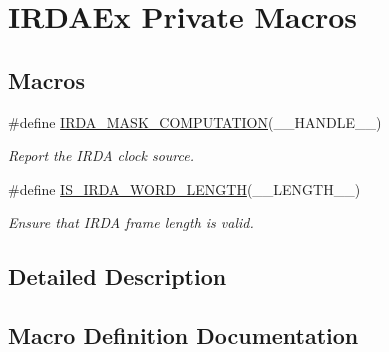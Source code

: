 \hypertarget{group___i_r_d_a_ex___private___macros}{}\section{I\+R\+D\+A\+Ex Private Macros}
\label{group___i_r_d_a_ex___private___macros}
\subsection*{Macros}
\begin{DoxyCompactItemize}
\item 
\#define \hyperlink{group___i_r_d_a_ex___private___macros_gab905bc46038b12561969148fa4929888}{I\+R\+D\+A\+\_\+\+M\+A\+S\+K\+\_\+\+C\+O\+M\+P\+U\+T\+A\+T\+I\+ON}(\+\_\+\+\_\+\+H\+A\+N\+D\+L\+E\+\_\+\+\_\+)
\begin{DoxyCompactList}\small\item\em Report the I\+R\+DA clock source. \end{DoxyCompactList}\item 
\#define \hyperlink{group___i_r_d_a_ex___private___macros_ga15dafbab24754dafb0c2fc3ce081c715}{I\+S\+\_\+\+I\+R\+D\+A\+\_\+\+W\+O\+R\+D\+\_\+\+L\+E\+N\+G\+TH}(\+\_\+\+\_\+\+L\+E\+N\+G\+T\+H\+\_\+\+\_\+)
\begin{DoxyCompactList}\small\item\em Ensure that I\+R\+DA frame length is valid. \end{DoxyCompactList}\end{DoxyCompactItemize}


\subsection{Detailed Description}


\subsection{Macro Definition Documentation}
\mbox{\label{group___i_r_d_a_ex___private___macros_gab905bc46038b12561969148fa4929888}} 
